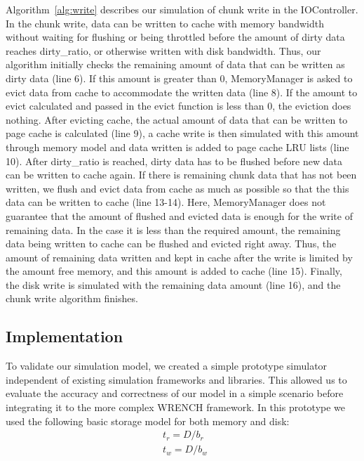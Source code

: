 \documentclass[conference]{IEEEtran}
\begin{document}
			Algorithm~\ref{alg:write} describes our simulation of chunk write in 
			the IOController. 
			In the chunk write, data can be written to cache with memory bandwidth 
			without waiting for flushing or being throttled before the amount of 
			dirty data reaches dirty\_ratio, or otherwise written with disk bandwidth.
			Thus, our algorithm initially checks the remaining amount of data that 
			can be written as dirty data (line 6).
			If this amount is greater than 0, MemoryManager is asked to evict 
			data from cache to accommodate the written data (line 8). 
			If the amount to evict calculated and passed in the evict function is less than 0, 
			the eviction does nothing.
			After evicting cache, the actual amount of data that can be written to 
			page cache is calculated (line 9), a cache write is then simulated 
			with this amount through memory model and data written is added to 
			page cache LRU lists (line 10).
			After dirty\_ratio is reached, dirty data has to be flushed before new data 
			can be written to cache again. 
			If there is remaining chunk data that has not been written, we flush and 
			evict data from cache as much as possible so that the this data can be 
			written to cache (line 13-14). 
			Here, MemoryManager does not guarantee that the amount of flushed 
			and evicted data is enough for the write of remaining data. 
			In the case it is less than the required amount, the remaining data 
			being written to cache can be flushed and evicted right away. 
			Thus, the amount of remaining data written and kept in cache 
			after the write is limited by the amount free memory, and this amount 
			is added to cache (line 15). 
			Finally, the disk write is simulated with the remaining data amount (line 16), 
			and the chunk write algorithm finishes.
			
		\subsection{Implementation}

			To validate our simulation model, we created a simple prototype
			simulator independent of existing simulation frameworks and libraries. 
			This allowed us to evaluate the accuracy and correctness of our 
			model in a simple scenario before integrating it to the more complex 
			WRENCH framework. 
			In this prototype we used the following basic storage model for 
			both memory and disk: 
			\begin{align*}
				& t_{r} = D / b_r \\ 
				& t_{w} = D / b_w\
			\end{align*}		
			
\end{document}
